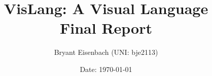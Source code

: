 \documentclass[titlepage]{article}
\title{VisLang: A Visual Language\\Final Report}
\author{Bryant Eisenbach (UNI: bje2113)}
\date{Date: \today}
\begin{document}
\maketitle
\pagebreak

\tableofcontents
\pagebreak

\listoffigures

\listoftables

\listoflistings
\pagebreak


\pagebreak


\pagebreak


\pagebreak


\pagebreak


\pagebreak


\pagebreak


\pagebreak


\end{document}
